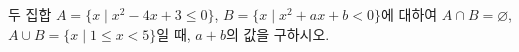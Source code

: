 두 집합 $A=\{x \mid x^2-4x+3\le 0\}$, $B=\{x \mid x^2+ax+b<0\}$에 대하여 $A\cap B=\varnothing$, $A\cup B=\{x \mid 1\le x<5\}$일 때, $a+b$의 값을 구하시오. 
